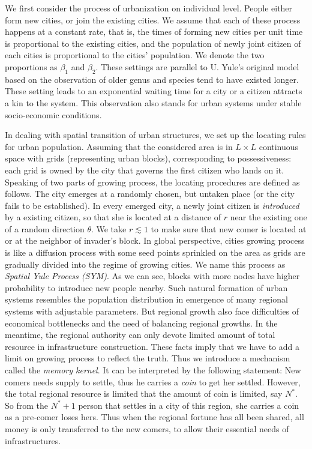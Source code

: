 \documentclass[reprint,unsortedaddress,amsmath,amssymb,floatfix,aps,prl,showkeys]{revtex4-2}
\begin{document}
We first consider the process of urbanization on individual level. People either form new cities, or join the existing cities. We assume that each of these process happens at a constant rate, that is, the times of forming new cities per unit time is proportional to the existing cities, and the population of newly joint citizen of each cities is proportional to the cities' population. We denote the two proportions as $\beta_1$ and $\beta_2$. These settings are parallel to U. Yule's original model\cite{yule1925ii} based on the observation of older genus and species tend to have existed longer. These setting leads to an exponential waiting time for a city or a citizen attracts a kin to the system. This observation also stands for urban systems under stable socio-economic conditions. %

In dealing with spatial transition of urban structures, we set up the locating rules for urban population. Assuming that the considered area is in $L\times L$ continuous space with grids (representing urban blocks), corresponding to possessiveness: each grid is owned by the city that governs the first citizen who lands on it. Speaking of two parts of growing process, the locating procedures are defined as follows. The city emerges at a randomly chosen, but untaken place (or the city fails to be established). In every emerged city, a newly joint citizen is \emph{introduced} by a existing citizen, so that she is located at a distance of $r$ near the existing one of a random direction $\theta$. We take $r\lesssim 1$ to make sure that new comer is located at or at the neighbor of invader's block. In global perspective, cities growing process is like a diffusion process with some seed points sprinkled on the area as grids are gradually divided into the regime of growing cities. We name this process as \emph{Spatial Yule Process (SYM)}. As we can see, blocks with more nodes have higher probability to introduce new people nearby. Such natural formation of urban systems resembles the population distribution in emergence of many regional systems with adjustable parameters. But regional growth also face difficulties of economical bottlenecks and the need of balancing regional growths. In the meantime, the regional authority can only devote limited amount of total resource in infrastructure construction. These facts imply that we have to add a limit on growing process to reflect the truth. Thus we introduce a mechanism called the \emph{memory kernel}. It can be interpreted by the following statement: New comers needs supply to settle, thus he carries a \emph{coin} to get her settled. However, the total regional resource is limited that the amount of coin is limited, say $N^*$. So from the $N^*+1$ person that settles in a city of this region, she carries a coin as a pre-comer loses hers. Thus when the regional fortune has all been shared, all money is only transferred to the new comers, to allow their essential needs of infrastructures. 
\end{document}
